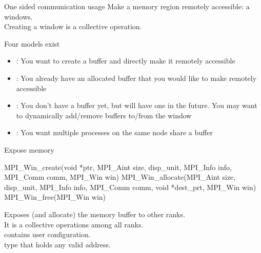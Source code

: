 \documentclass[aspectratio=43]{beamer}
\begin{document}
\begin{frame}[fragile]{One sided communication usage}
Make a memory region remotely accessible: a windows.\\
Creating a window is a collective operation.

Four models exist
\begin{itemize}
    \item {}: You want to create a buffer and directly make it remotely accessible
    \item {}: You already have an allocated buffer that you would like to make remotely accessible
    \item {}: You don’t have a buffer yet, but will have one in the future. You may want to dynamically add/remove buffers to/from the window
    \item {}: You want multiple processes on the same node share a buffer
\end{itemize}


\end{frame}

\begin{frame}[fragile]{Expose memory}

\begin{Pseudolisting}[]{}
MPI_Win_create(void *ptr, MPI_Aint size, disp_unit,
               MPI_Info info, MPI_Comm comm, MPI_Win win)
MPI_Win_allocate(MPI_Aint size, disp_unit, MPI_Info info,
                 MPI_Comm comm, void *dest_prt, MPI_Win win)
MPI_Win_free(MPI_Win win)
\end{Pseudolisting}
Exposes (and allocate) the memory buffer to other ranks.\\
It is a collective operations among all ranks.\\

 contains user configuration.\\
 type that holds any valid address.
\end{frame}
\end{document}
